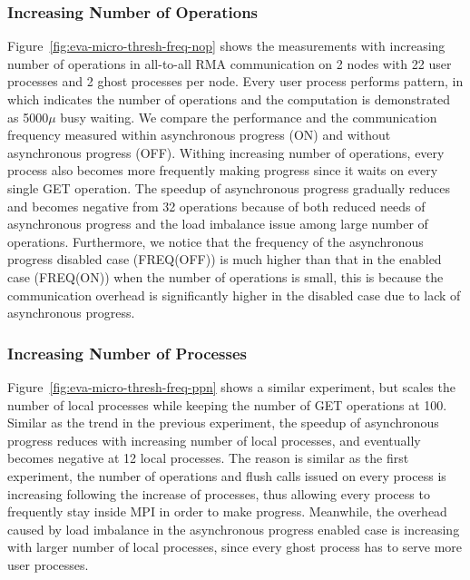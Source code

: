 \subsubsection{Increasing Number of Operations}
Figure~\ref{fig:eva-micro-thresh-freq-nop} shows the measurements
with increasing number of operations in all-to-all RMA communication
on 2 nodes with 22 user processes and 2 ghost processes per node.
Every user process performs 
pattern, in which  indicates the number of operations and the
computation is demonstrated as 5000$\mu$ busy waiting. We compare the
performance and the communication frequency measured within asynchronous
progress (ON) and without asynchronous progress (OFF).
Withing increasing number of operations, every process also becomes
more frequently making progress since it waits on every single GET
operation. The speedup of asynchronous progress gradually reduces and
becomes negative from 32 operations because of both reduced needs of
asynchronous progress and the load imbalance issue among large number
of operations. Furthermore, we notice that the frequency of the
asynchronous progress disabled case (FREQ(OFF)) is much higher than
that in the enabled case (FREQ(ON)) when the number of operations is
small, this is because the communication overhead is significantly
higher in the disabled case due to lack of asynchronous progress.

\subsubsection{Increasing Number of Processes}
Figure~\ref{fig:eva-micro-thresh-freq-ppn} shows a similar experiment,
but scales the number of local processes while keeping the number of
GET operations at 100. Similar as the trend in the previous experiment,
the speedup of asynchronous progress reduces with increasing number of
local processes, and eventually becomes negative at 12 local processes.
The reason is similar as the first experiment, the number of operations
and flush calls issued on every process is increasing following the
increase of processes, thus allowing every process to frequently stay
inside MPI in order to make progress. Meanwhile, the overhead caused by
load imbalance in the asynchronous progress enabled case is increasing
with larger number of local processes, since every ghost process has to
serve more user processes.

